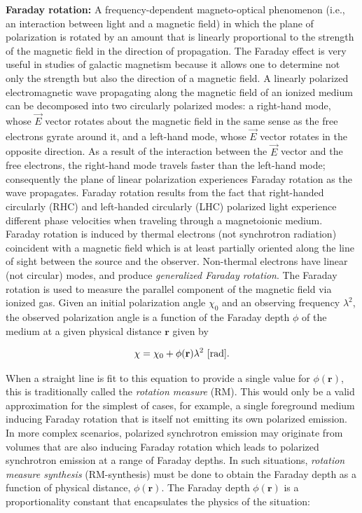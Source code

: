 \documentclass[a4paper,10pt]{article}
\begin{document}
{\noindent}\textbf{Faraday rotation:} A frequency-dependent magneto-optical phenomenon (i.e., an interaction between light and a magnetic field) in which the plane of polarization is rotated by an amount that is linearly proportional to the strength of the magnetic field in the direction of propagation. The Faraday effect is very useful in studies of galactic magnetism because it allows one to determine not only the strength but also the direction of a magnetic field. A linearly polarized electromagnetic wave propagating along the magnetic field of an ionized medium can be decomposed into two circularly polarized modes: a right-hand mode, whose $\vec{E}$ vector rotates about the magnetic field in the same sense as the free electrons gyrate around it, and a left-hand mode, whose $\vec{E}$ vector rotates in the opposite direction. As a result of the interaction between the $\vec{E}$ vector and the free electrons, the right-hand mode travels faster than the left-hand mode; consequently the plane of linear polarization experiences Faraday rotation as the wave propagates. Faraday rotation results from the fact that right-handed circularly (RHC) and left-handed circularly (LHC) polarized light experience different phase velocities when traveling through a magnetoionic medium. Faraday rotation is induced by thermal electrons (not synchrotron radiation) coincident with a magnetic field which is at least partially oriented along the line of sight between the source and the observer. Non-thermal electrons have linear (not circular) modes, and produce \textit{generalized Faraday rotation}. The Faraday rotation is used to measure the parallel component of the magnetic field via ionized gas. Given an initial polarization angle $\chi_0$ and an observing frequency $\lambda^2$, the observed polarization angle is a function of the Faraday depth $\phi$ of the medium at a given physical distance $\mathbf{r}$ given by

\begin{align*}
    \chi = \chi_0 + \phi(\mathbf{r}) \lambda^2 ~[{\rm rad}].
\end{align*}

{\noindent}When a straight line is fit to this equation to provide a single value for $\phi(\mathbf{r})$, this is traditionally called the \textit{rotation measure} (RM). This would only be a valid approximation for the simplest of cases, for example, a single foreground medium inducing Faraday rotation that is itself not emitting its own polarized emission. In more complex scenarios, polarized synchrotron emission may originate from volumes that are also inducing Faraday rotation which leads to polarized synchrotron emission at a range of Faraday depths. In such situations, \textit{rotation measure synthesis} (RM-synthesis) must be done to obtain the Faraday depth as a function of physical distance, $\phi(\mathbf{r})$. The Faraday depth $\phi(\mathbf{r})$ is a proportionality constant that encapsulates the physics of the situation:
\end{document}
